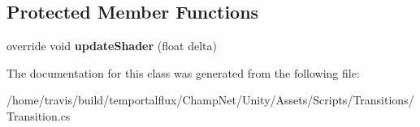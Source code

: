 \subsection*{Protected Member Functions}
\begin{DoxyCompactItemize}
\item 
\hypertarget{class_transition_ab9fc84a48414ad28759401260ca0b954}{override void {\bfseries update\-Shader} (float delta)}\label{class_transition_ab9fc84a48414ad28759401260ca0b954}

\end{DoxyCompactItemize}


The documentation for this class was generated from the following file\-:\begin{DoxyCompactItemize}
\item 
/home/travis/build/temportalflux/\-Champ\-Net/\-Unity/\-Assets/\-Scripts/\-Transitions/Transition.\-cs\end{DoxyCompactItemize}
